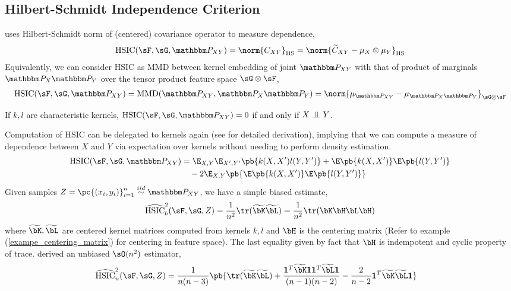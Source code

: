 \documentclass[11pt]{article}
\begin{document}
\subsection{Hilbert-Schmidt Independence Criterion}

\cite{grettonMeasuringStatisticalDependence2005} uses Hilbert-Schmidt norm of (centered) covariance operator to measure dependence,
\begin{align}
    \text{HSIC}(\sF,\sG,\bbP_{XY})
        = \norm{C_{XY}}_{\text{HS}}
        = \norm{ \widetilde{C}_{XY} - \mu_X \otimes \mu_{Y} }_{\text{HS}}
\end{align}
Equivalently, we can consider $\text{HSIC}$ as MMD between kernel embedding of joint $\bbP_{XY}$ with that of product of marginals $\bbP_X\bbP_Y$ over the tensor product feature space $\sG\otimes\sF$,
\begin{align}
    \text{HSIC}(\sF,\sG,\bbP_{XY})
        = \text{MMD}(\bbP_{XY},\bbP_X\bbP_Y)
        = \norm{ \mu_{\bbP_{XY}} - \mu_{\bbP_X\bbP_Y} }_{\sG\otimes\sF}
\end{align} 

\begin{proposition}
    If $k,l$ are characteristic kernels, $\text{HSIC}(\sF,\sG,\bbP_{XY})=0$ if and only if $X\perp\!\!\!\perp Y$.
\end{proposition}

Computation of HSIC can be delegated to kernels again (see \cite{grettonNotesMeanEmbeddings2019} for detailed derivation), implying that we can compute a measure of dependence between $X$ and $Y$ via expectation over kernels without needing to perform density estimation. 
\begin{align}
    \text{HSIC}(\sF,\sG,\bbP_{XY})
        &= \E_{X,Y} \E_{X',Y'} \pb{k(X,X')l(Y,Y')}
            + \E\pb{k(X,X')}\E\pb{l(Y,Y')} \\ 
        &\quad -2 \E_{X,Y} \pb{ \E\pb{k(X,X')} \E\pb{l(Y,Y')} }
\end{align}
Given samples $Z = \pc{(x_i,y_i)}_{i=1}^n \overset{iid}{\sim} \bbP_{XY}$, we have a simple biased estimate,
\begin{align}
    \widehat{\text{HSIC}}_b^2(\sF,\sG,Z)
        = \frac{1}{n^2} \tr(\widetilde{\bK}\widetilde{\bL})
        = \frac{1}{n^2} \tr(\bK\bH\bL\bH)
\end{align}
where $\widetilde{\bK},\widetilde{\bL}$ are centered kernel matrices computed from kernels $k,l$ and $\bH$ is the centering matrix (Refer to example (\ref{exampe_centering_matrix}) for centering in feature space). The last equality given by fact that $\bH$ is indempotent and cyclic property of trace. \cite{songFeatureSelectionDependence2012a} derived an unbiased $\sO(n^2)$ estimator,
\begin{align}
    \widehat{\text{HSIC}}_u^2(\sF,\sG,Z)
        &= \frac{1}{n(n-3)} \pb{
            \tr(\widetilde{\bK}\widetilde{\bL}) + 
            \frac{ \mathbf{1}^T \widetilde{\bK} \mathbf{1} \mathbf{1}^T \widetilde{\bL} \mathbf{1} }{ (n-1)(n-2) } -
            \frac{2}{n-2} \mathbf{1}^T \widetilde{\bK}\widetilde{\bL}\mathbf{1} 
        }
\end{align}
\end{document}
